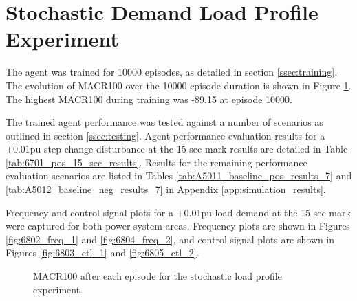 \section{Stochastic Demand Load Profile Experiment}\label{sec:stochastic_load_demand}
The agent was trained for 10000 episodes, as detailed in section \ref{ssec:training}. The evolution of MACR100 over the 10000 episode duration is shown in Figure \ref{fig:6801_average_reward}. The highest MACR100 during training was -89.15 at episode 10000.

The trained agent performance was tested against a number of scenarios as outlined in section \ref{ssec:testing}. Agent performance evaluation results for a +0.01pu step change disturbance at the 15 sec mark results are detailed in Table \ref{tab:6701_pos_15_sec_results}. Results for the remaining performance evaluation scenarios are listed in Tables \ref{tab:A5011_baseline_pos_results_7} and \ref{tab:A5012_baseline_neg_results_7} in Appendix \ref{app:simulation_results}. 

Frequency and control signal plots for a +0.01pu load demand at the 15 sec mark were captured for both power system areas. Frequency plots are shown in Figures \ref{fig:6802_freq_1} and \ref{fig:6804_freq_2}, and control signal plots are shown in Figures \ref{fig:6803_ctl_1} and \ref{fig:6805_ctl_2}.

\begin{figure}[h]
	\centering
	
	\caption{MACR100 after each episode for the stochastic load profile experiment.}\label{fig:6801_average_reward}
\end{figure}



